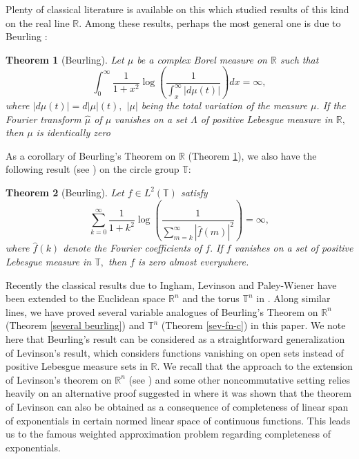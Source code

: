 \documentclass [11pt]{amsart}
\newtheorem{Thm}{Theorem}[section]
\newcommand{\R}{\mathbb R}
\newcommand{\T}{\mathbb T}
\numberwithin{equation}{section}
\begin{document}
Plenty of classical literature is available on this \cite{B, I, K, L1, PW} which studied results of this kind on the real line $\R.$ Among these results, perhaps the most general one is due to Beurling \cite{B, K}: 
 \begin{Thm}[Beurling]\label{ber-th}
 	Let $\mu$ be a complex Borel measure on $\R$ such that 
 	\begin{equation*}\label{eq;1}
 	\int_0^{\infty}\dfrac{1}{1+x^2}\log\left(\dfrac{1}{\int_x^{\infty}|d\mu(t)|}\right)dx=\infty,
 	\end{equation*}
where $|d\mu(t)| = d|\mu|(t),$ $|\mu|$ being the total variation of the measure $\mu$. If the Fourier transform $\widehat{\mu}$ of $\mu$ vanishes on a set $\Lambda$ of positive Lebesgue measure in $\R,$ then $\mu $ is identically zero 
 \end{Thm}
\noindent As a corollary of Beurling's Theorem on $\R$ (Theorem \ref{ber-th}), we also have the following result (see \cite{B, K}) on the circle group $\T$:
\begin{Thm}[Beurling]\label{ber-th-c}
Let $f\in L^2(\T)$ satisfy
\begin{equation*}\label{eq;7c}
\sum_{k=0}^\infty\dfrac{1}{1+k^2} \log\left(\dfrac{1}{\sum_{m=k}^\infty |\widehat{f}(m)|^2}\right)=\infty,
\end{equation*}
where $\widehat{f}(k)$ denote the Fourier coefficients of $f.$ If $f$ vanishes on a set of positive Lebesgue measure in $\T,$ then $f$ is zero almost everywhere.
\end{Thm}

Recently the classical results due to Ingham, Levinson and Paley-Wiener have been extended to the Euclidean space $\R^n$ and the torus $\T^n$ in \cite{BRS}. Along similar lines, we have proved several variable analogues of Beurling's Theorem on $\R^n$ (Theorem \ref{several beurling}) and $\T^n$ (Theorem \ref{sev-fn-c}) in this paper. We note here that Beurling's result can be considered as a straightforward generalization of Levinson's result, which considers functions vanishing on open sets instead of positive Lebesgue measure sets in $\R.$ We recall that the approach to the extension of Levinson's theorem on $\R^n$ (see \cite{BRS}) and some other noncommutative setting relies heavily on an alternative proof suggested in \cite{K} where it was shown that the theorem of Levinson can also be obtained as a consequence of completeness of linear span of exponentials in certain normed linear space of continuous functions. This leads us to the famous weighted approximation problem regarding completeness of exponentials.
\end{document}
